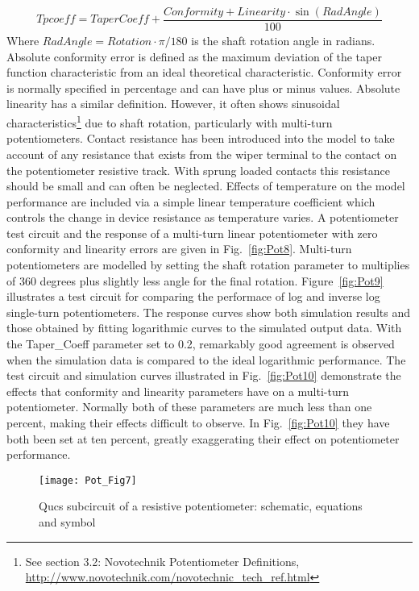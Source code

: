 \begin{align}
\label{eq:pequ5}
Tpcoeff=TaperCoeff+\dfrac{Conformity+Linearity\cdot \sin{\left( RadAngle  \right)}}{100}
\end{align}
Where $ RadAngle = Rotation \cdot \pi/180$ is the shaft rotation angle
in radians. Absolute conformity error is defined as the maximum
deviation of the taper function characteristic from an ideal
theoretical characteristic. Conformity error is normally specified in
percentage and can have plus or minus values. Absolute linearity has a
similar definition. However, it often shows sinusoidal
characteristics\footnote{See section 3.2: Novotechnik Potentiometer
Definitions,
\url{http://www.novotechnik.com/novotechnic_tech_ref.html}} due to
shaft rotation, particularly with multi-turn potentiometers. Contact
resistance has been introduced into the model to take account of any
resistance that exists from the wiper terminal to the contact on the
potentiometer resistive track. With sprung loaded contacts this
resistance should be small and can often be neglected. Effects of
temperature on the model performance are included via a simple linear
temperature coefficient which controls the change in device resistance
as temperature varies. A potentiometer test circuit and the response
of a multi-turn linear potentiometer with zero conformity and
linearity errors are given in Fig.~\ref{fig:Pot8}. Multi-turn
potentiometers are modelled by setting the shaft rotation parameter to
multiplies of 360 degrees plus slightly less angle for the final
rotation. Figure~\ref{fig:Pot9} illustrates a test circuit for
comparing the performace of log and inverse log single-turn
potentiometers. The response curves show both simulation results and
those obtained by fitting logarithmic curves to the simulated output
data. With the Taper\_Coeff parameter set to 0.2, remarkably good
agreement is observed when the simulation data is compared to the
ideal logarithmic performance. The test circuit and simulation curves
illustrated in Fig.~\ref{fig:Pot10} demonstrate the effects that
conformity and linearity parameters have on a multi-turn
potentiometer.  Normally both of these parameters are much less than
one percent, making their effects difficult to observe.  In
Fig.~\ref{fig:Pot10} they have both been set at ten percent, greatly
exaggerating their effect on potentiometer performance.

\begin{figure} [h] 
  \centering
  \texttt{[image: Pot\_Fig7]}
  \caption{Qucs subcircuit of a resistive potentiometer: schematic, equations and symbol}
  \label{fig:Pot7}
\end{figure} 

